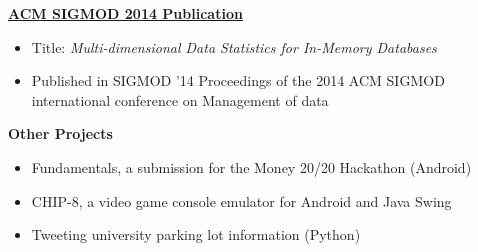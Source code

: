 \documentclass[margin]{res}
\begin{document}
\begin{resume}
\href{http://dl.acm.org/citation.cfm?id=2612663}{\bf ACM SIGMOD 2014 Publication} 
\begin{itemize} \itemsep -2pt
\item Title: \textit{Multi-dimensional Data Statistics for In-Memory Databases}
\item Published in SIGMOD '14 Proceedings of the 2014 ACM SIGMOD international conference on Management of data
\end{itemize}

{\bf Other Projects}
\begin{itemize} \itemsep -2pt
\item Fundamentals, a submission for the Money 20/20 Hackathon (Android)
\item CHIP-8, a video game console emulator for Android and Java Swing
\item Tweeting university parking lot information (Python)
\end{itemize}

\end{resume} 
\end{document}

